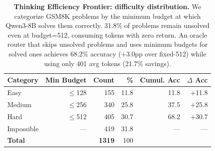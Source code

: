 \begin{table}[t]
\centering
\caption{\textbf{Thinking Efficiency Frontier: difficulty distribution.}
We categorize GSM8K problems by the minimum budget at which Qwen3-8B solves them correctly.
31.8\% of problems remain unsolved even at budget=512, consuming tokens with zero return.
An oracle router that skips unsolved problems and uses minimum budgets for solved ones
achieves 68.2\% accuracy ($+$3.0pp over fixed-512) while using only 401 avg tokens (21.7\% savings).}
\label{tab:efficiency-frontier}
\small
\begin{tabular}{lrrrrr}
\toprule
\textbf{Category} & \textbf{Min Budget} & \textbf{Count} & \textbf{\%} & \textbf{Cumul. Acc} & \textbf{$\Delta$ Acc} \\
\midrule
Easy       & $\leq$128 & 155  & 11.8 & 11.8 & +11.8 \\
Medium     & $\leq$256 & 340  & 25.8 & 37.5 & +25.8 \\
Hard       & $\leq$512 & 405  & 30.7 & 68.2 & +30.7 \\
Impossible & ---       & 419  & 31.8 & ---  & --- \\
\midrule
\multicolumn{2}{l}{\textbf{Total}} & \textbf{1319} & 100 & & \\
\bottomrule
\end{tabular}
\end{table}
